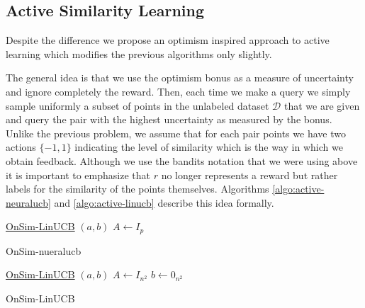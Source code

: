 \documentclass{article}
\begin{document}
  \subsection{Active Similarity Learning}
  Despite the difference we propose an optimism inspired approach to active learning which modifies the previous algorithms only slightly.

  The general idea is that we use the optimism bonus as a measure of uncertainty and ignore completely the reward.
  Then, each time we make a query we simply sample uniformly a subset of points in the unlabeled dataset $\mathcal{D}$ that we are given and query the pair with the highest uncertainty as measured by the bonus. Unlike the previous problem, we assume that for each pair points we have two actions $\{-1, 1 \}$ indicating the level of similarity which is the way in which we obtain feedback.
  Although we use the bandits notation that we were using above it is important to emphasize that $r$ no longer represents a reward but rather labels for the similarity of the points themselves. Algorithms \ref{algo:active-neuralucb} and \ref{algo:active-linucb} describe this idea formally.

  \begin{algorithm}
  \label{algo:active-neuralucb}
    \underline{OnSim-LinUCB} $(a,b)$\;
    $A \gets I_{p}$\;
    \caption{OnSim-nueralucb}
  \end{algorithm}


\begin{algorithm}
  \label{algo:active-linucb}
    \underline{OnSim-LinUCB} $(a,b)$\;
    $A \gets I_{n^2}$\;
    $b \gets 0_{n^2}$\;
    \caption{OnSim-LinUCB}
\end{algorithm}
\end{document}
